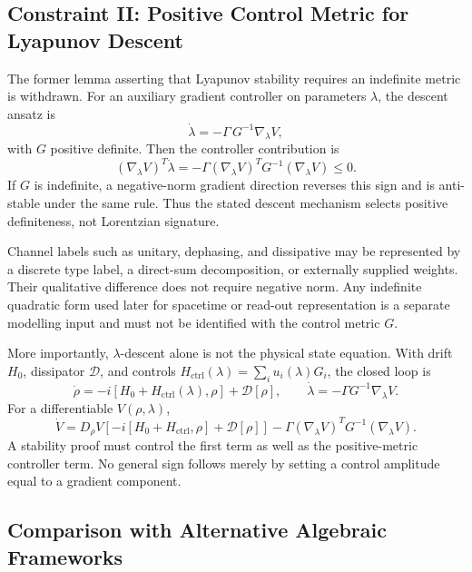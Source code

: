 \documentclass[12pt,a4paper,openany]{book}
\begin{document}
\subsection{Constraint II: Positive Control Metric for Lyapunov Descent}
\label{Q-B-sec:metric}

The former lemma asserting that Lyapunov stability requires an indefinite metric is withdrawn.  For an auxiliary gradient controller on parameters $\lambda$, the descent ansatz is
\begin{equation}
\dot{\lambda} = -\Gamma\, G^{-1} \nabla_\lambda V,
\label{Q-B-eq:gradient}
\end{equation}
with $G$ positive definite.  Then the controller contribution is
\begin{equation}
(\nabla_\lambda V)^T\dot\lambda
=-\Gamma(\nabla_\lambda V)^TG^{-1}(\nabla_\lambda V)\leq0.
\end{equation}
If $G$ is indefinite, a negative-norm gradient direction reverses this sign and is anti-stable under the same rule.  Thus the stated descent mechanism selects positive definiteness, not Lorentzian signature.

Channel labels such as unitary, dephasing, and dissipative may be represented by a discrete type label, a direct-sum decomposition, or externally supplied weights.  Their qualitative difference does not require negative norm.  Any indefinite quadratic form used later for spacetime or read-out representation is a separate modelling input and must not be identified with the control metric $G$.

More importantly, $\lambda$-descent alone is not the physical state equation.  With drift $H_0$, dissipator $\mathcal D$, and controls $H_{\mathrm{ctrl}}(\lambda)=\sum_i u_i(\lambda)G_i$, the closed loop is
\begin{equation}
\dot\rho= -i[H_0+H_{\mathrm{ctrl}}(\lambda),\rho]+\mathcal D[\rho],
\qquad
\dot\lambda=-\Gamma G^{-1}\nabla_\lambda V.
\end{equation}
For a differentiable $V(\rho,\lambda)$,
\begin{equation}
\dot V=D_\rho V\!\left[-i[H_0+H_{\mathrm{ctrl}},\rho]+\mathcal D[\rho]\right]
-\Gamma(\nabla_\lambda V)^TG^{-1}(\nabla_\lambda V).
\end{equation}
A stability proof must control the first term as well as the positive-metric controller term.  No general sign follows merely by setting a control amplitude equal to a gradient component.

\subsection{Comparison with Alternative Algebraic Frameworks}
\label{Q-B-sec:exclusion}
\end{document}
